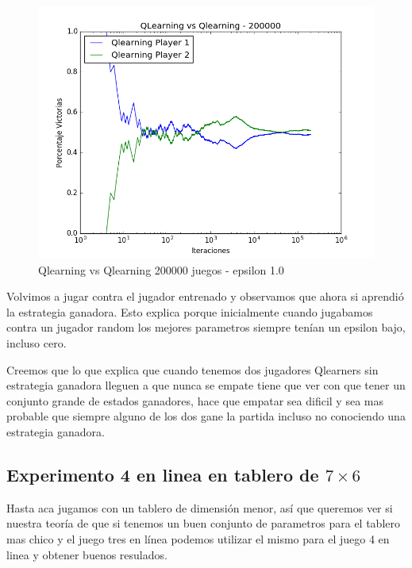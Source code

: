\begin{figure}[h]
 \centering
 \begin{minipage}{.45\textwidth}
	\centering
	\includegraphics[scale=0.35]{img1/QlearningVsQlearning_200000_6x5_merge_e0p1.png}
        \caption{Qlearning vs Qlearning 200000 juegos - epsilon 1.0}
  \end{minipage}
\end{figure}


Volvimos a jugar contra el jugador entrenado y observamos que ahora si aprendió la estrategia ganadora. Esto explica porque inicialmente cuando jugabamos contra un jugador random los mejores parametros siempre tenían un epsilon bajo, incluso cero. 

Creemos que lo que explica que cuando tenemos dos jugadores Qlearners sin estrategia ganadora lleguen a que nunca se empate tiene que ver con que tener un conjunto grande de estados ganadores, hace que empatar sea dificil y sea mas probable que siempre alguno de los dos gane la partida incluso no conociendo una estrategia ganadora.\\



\subsection{Experimento 4 en linea en tablero de $7\times6$}
Hasta aca jugamos con un tablero de dimensión menor, así que queremos ver si nuestra teoría de que si tenemos un buen conjunto de parametros para el tablero mas chico y el juego tres en línea podemos utilizar el mismo para el juego 4 en linea y obtener buenos resulados.

